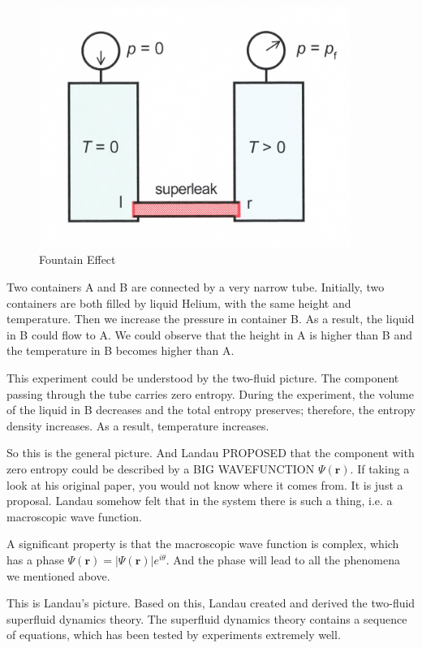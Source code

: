 \begin{figure}[htbp]
\centering
\includegraphics[width=4in]{image/1-3-fountain.pdf} 
\caption{Fountain Effect}
\label{fig:1-3}
\end{figure}

Two containers A and B are connected by a very narrow tube. Initially, two containers are both filled by liquid Helium, with the same height and temperature. Then we increase the pressure in container B. As a result, the liquid in B could flow to A. We could observe that the height in A is higher than B and the temperature in B becomes higher than A.

This experiment could be understood by the two-fluid picture. The component passing through the tube carries zero entropy. During the experiment, the volume of the liquid in B decreases and the total entropy preserves; therefore, the entropy density increases. As a result, temperature increases.

So this is the general picture. And Landau PROPOSED that the component with zero entropy could be described by a BIG WAVEFUNCTION $\Psi(\bm r)$. If taking a look at his original paper, you would not know where it comes from. It is just a proposal. Landau somehow felt that in the system there is such a thing, i.e. a macroscopic wave function. 

A significant property is that the macroscopic wave function is complex, which has a phase $\Psi(\bm r)= |\Psi(\bm r)|e^{i\theta}$. And the phase will lead to all the phenomena we mentioned above.

This is Landau's picture. Based on this, Landau created and derived the two-fluid superfluid dynamics theory. The superfluid dynamics theory contains a sequence of equations, which has been tested by experiments extremely well.

